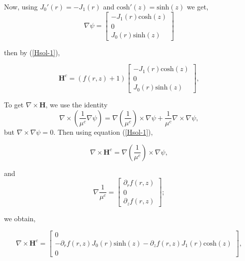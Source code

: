 \documentclass[11pt]{amsart}
\begin{document}
\noindent Now, using $J_0'(r)=-J_1(r)$ and $\text{cosh}'(z)=\text{sinh}(z)$  we get,
\begin{equation}
\nabla \psi = \left[ \begin{array}{c} -J_1 (r)  \text{cosh}(z) \\ 0 \\J_0 (r)  \text{sinh}(z) \end{array} \right]
\end{equation}

\noindent then by (\ref{Hsol-1}), 

\begin{equation}
\mathbf{H}^c=(f(r,z)+1)
\left[ \begin{array}{c} -J_1 (r)  \text{cosh}(z) \\ 0 \\J_0 (r)  \text{sinh}(z) \end{array} \right],
\end{equation}

\noindent To get $\nabla \times \mathbf{H}$, we use the identity 
$$
\nabla \times \left (\frac{1}{{\mu}^c} \nabla \psi \right )= \nabla \left ( \frac{1}{{\mu}^c} \right ) \times  \nabla
\psi + \frac{1}{{\mu}^c} \nabla \times  \nabla \psi,
$$
but $\nabla \times  \nabla \psi = 0$. Then  using  equation (\ref{Hsol-1}), 

\begin{equation*}
\nabla \times \mathbf{H}^c=\nabla \left ( \frac{1}{{\mu}^c} \right ) \times  \nabla \psi, 
\end{equation*}

\noindent and 
\begin{equation}
 \nabla  \frac{1}{{\mu}^c}  =\left[ \begin{array}{c} \partial _r f(r,z) \\ 0  \\ \partial _z f(r,z) \end{array} \right];
\end{equation}

\noindent we obtain,

\begin{equation}
\nabla \times \mathbf{H}^c=
\left[ \begin{array}{c}
0 \\ 
-\partial _r f(r,z) J_0(r)   \text{sinh}(z)  
-\partial _z f(r,z) J_1(r)    \text{cosh}(z) \\
 0
\end{array} \right],
\end{equation}
\end{document}
